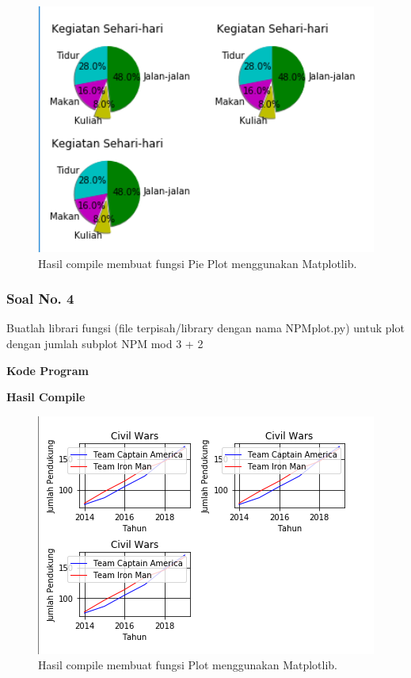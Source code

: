 \begin{figure}[H]
	\includegraphics[width=12cm]{figures/6/Praktek/1174051/p3.png}
	\centering
	\caption{Hasil compile membuat fungsi Pie Plot menggunakan Matplotlib.}
\end{figure}

\subsubsection{Soal No. 4}
\hfill \break
Buatlah librari fungsi (file terpisah/library dengan nama NPMplot.py) untuk plot dengan jumlah subplot NPM mod 3 + 2

\hfill \break
\textbf{Kode Program}



\hfill \break
\textbf{Hasil Compile}

\begin{figure}[H]
	\includegraphics[width=12cm]{figures/6/Praktek/1174051/p4.png}
	\centering
	\caption{Hasil compile membuat fungsi Plot menggunakan Matplotlib.}
\end{figure}


